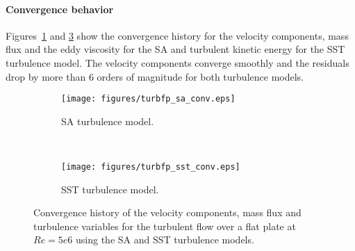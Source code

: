 \paragraph{Convergence behavior}
Figures~\ref{fig:convturbfpsa} and \ref{fig:convturbfpsst} show the convergence history for the velocity components, mass flux and the eddy viscosity for the SA and turbulent kinetic energy for the SST turbulence model. The velocity components converge smoothly and the residuals drop by more than $6$ orders of magnitude for both turbulence models.
\begin{figure}[h!]
    \centering
    \captionsetup{justification=centering}
    \begin{subfigure}[b]{0.48\textwidth}
    \captionsetup{justification=centering}
        \texttt{[image: figures/turbfp\_sa\_conv.eps]}
        \caption{SA turbulence model.}
        \label{fig:convturbfpsa}
    \end{subfigure}
    ~ %
    \begin{subfigure}[b]{0.48\textwidth}
    \captionsetup{justification=centering}
        \texttt{[image: figures/turbfp\_sst\_conv.eps]}
        \caption{SST turbulence model.}
        \label{fig:convturbfpsst}
    \end{subfigure}
    \caption{Convergence history of the velocity components, mass flux and turbulence variables for the turbulent flow over a flat plate at $Re=5e6$ using the SA  and SST turbulence models.}
\end{figure}

